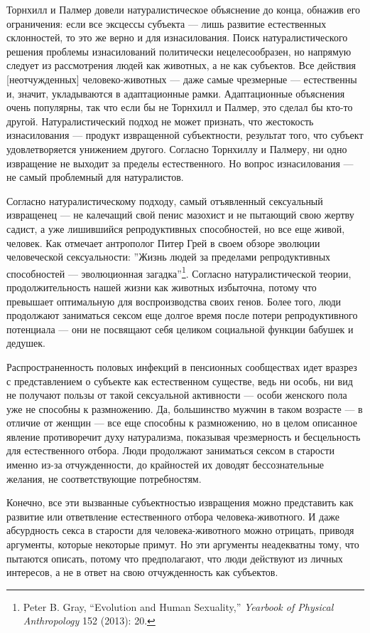 \documentclass[12pt]{book}
\begin{document}
Торнхилл и Палмер довели натуралистическое объяснение до конца, обнажив его ограничения: если все эксцессы субъекта --- лишь развитие естественных склонностей, то это же верно и для изнасилования. Поиск натуралистического решения проблемы изнасилований политически нецелесообразен, но напрямую следует из рассмотрения людей как животных, а не как субъектов. Все действия [неотчужденных] человеко-животных --- даже самые чрезмерные --- естественны и, значит, укладываются в адаптационные рамки. Адаптационные объяснения очень популярны, так что если бы не Торнхилл и Палмер, это сделал бы кто-то другой. Натуралистический подход не может признать, что жестокость изнасилования --- продукт извращенной субъектности, результат того, что субъект удовлетворяется унижением другого. Согласно Торнхиллу и Палмеру, ни одно извращение не выходит за пределы естественного. Но вопрос изнасилования --- не самый проблемный для натуралистов.

Согласно натуралистическому подходу, самый отъявленный сексуальный извращенец --- не калечащий свой пенис мазохист и не пытающий свою жертву садист, а уже лишившийся репродуктивных способностей, но все еще живой, человек. Как отмечает антрополог Питер Грей в своем обзоре эволюции человеческой сексуальности: ''Жизнь людей за пределами репродуктивных способностей --- эволюционная загадка''\footnote{Peter B. Gray, “Evolution and Human Sexuality,” \textit{Yearbook of Physical Anthropology} 152 (2013): 20.}. Согласно натуралистической теории, продолжительность нашей жизни как животных избыточна, потому что превышает оптимальную для воспроизводства своих генов. Более того, люди продолжают заниматься сексом еще долгое время после потери репродуктивного потенциала --- они не посвящают себя целиком социальной функции бабушек и дедушек.

Распространенность половых инфекций в пенсионных сообществах идет вразрез с представлением о субъекте как естественном существе, ведь ни особь, ни вид не получают пользы от такой сексуальной активности --- особи женского пола уже не способны к размножению. Да, большинство мужчин в таком возрасте --- в отличие от женщин --- все еще способны к размножению, но в целом описанное явление противоречит духу натурализма, показывая чрезмерность и бесцельность для естественного отбора. Люди продолжают заниматься сексом в старости именно из-за отчужденности, до крайностей их доводят бессознательные желания, не соответствующие потребностям.

Конечно, все эти вызванные субъектностью извращения можно представить как развитие или ответвление естественного отбора человека-животного. И даже абсурдность секса в старости для человека-животного можно отрицать, приводя аргументы, которые некоторые примут. Но эти аргументы неадекватны тому, что пытаются описать, потому что предполагают, что люди действуют из личных интересов, а не в ответ на свою отчужденность как субъектов.
\end{document}
